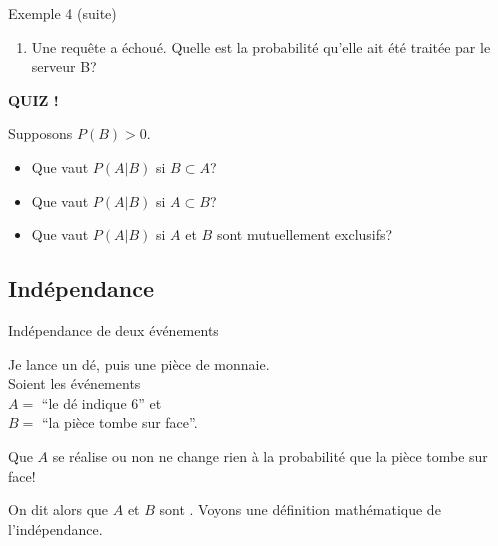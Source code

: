 \documentclass{BeamerTemplate}
\newcommand{\cibleReponse}{}
\newcommand{\lienreponse}[1]{\gdef\cibleReponse{#1}}
\begin{document}
\begin{frame}[t]{Exemple 4 (suite)}

{\small
 \begin{enumerate}[$\bullet$]
\item[b)] Une requête a échoué. Quelle est la probabilité qu'elle ait été traitée par le serveur B?
     \end{enumerate}
     }
\lienreponse{rep-ex1}
\end{frame}

\begin{frame}[t,label=quizpab]

\centerline{\LARGE\bfseries\alert{QUIZ !}}
Supposons $P(B)>0$.
\vspace{3mm}

\begin{itemize}\itemsep1.5cm
\item Que vaut $P(A|B)$ si $B\subset A$?

\item Que vaut $P(A|B)$ si $A\subset B$?

\item Que vaut $P(A|B)$ si $A$ et $B$ sont mutuellement exclusifs?
\vspace{1cm}
\end{itemize}
\lienreponse{rep-quiz}
\end{frame}

\subsection{Indépendance}

\begin{frame}[t]{Indépendance de deux événements}

 \bigskip
 Je lance un dé, puis une pièce de monnaie. \\Soient les événements\\
  $A=$ \enquote{le dé indique 6} et \\
  $B=$ \enquote{la pièce tombe sur face}. \\

  \bigskip

Que $A$ se réalise ou non ne change rien à la probabilité que la pièce tombe sur face!
\bigskip

On dit alors que $A$ et $B$ sont . Voyons une définition mathématique de l'indépendance.
\end{frame}
\end{document}
